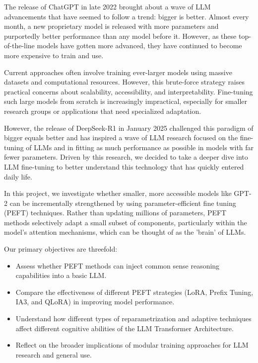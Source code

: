 \documentclass[11pt,twocolumn]{article}
\begin{document}
\indent The release of ChatGPT in late 2022 brought about a wave of LLM advancements that have seemed to follow a trend: bigger is better. Almost every month, a new proprietary model is released with more parameters and purportedly better performance than any model before it. However, as these top-of-the-line models have gotten more advanced, they have continued to become more expensive to train and use. 

Current approaches often involve training ever-larger models using massive datasets and computational resources. However, this brute-force strategy raises practical concerns about scalability, accessibility, and interpretability. Fine-tuning such large models from scratch is increasingly impractical, especially for smaller research groups or applications that need specialized adaptation.

However, the release of DeepSeek-R1 in January 2025 challenged this paradigm of bigger equals better and has inspired a wave of LLM research focused on the fine-tuning of LLMs and in fitting as much performance as possible in models with far fewer parameters. Driven by this research, we decided to take a deeper dive into LLM fine-tuning to better understand this technology that has quickly entered daily life.

In this project, we investigate whether smaller, more accessible models like GPT-2 can be incrementally strengthened by using parameter-efficient fine tuning (PEFT) techniques. Rather than updating millions of parameters, PEFT methods selectively adapt a small subset of components, particularly within the model's attention mechanisms, which can be thought of as the 'brain' of LLMs.

Our primary objectives are threefold:
\begin{itemize}
    \item Assess whether PEFT methods can inject common sense reasoning capabilities into a basic LLM.
    \item Compare the effectiveness of different PEFT strategies (LoRA, Prefix Tuning, IA3, and QLoRA) in improving model performance.
    \item Understand how different types of reparametrization and adaptive techniques affect different cognitive abilities of the LLM Transformer Architecture.
    \item Reflect on the broader implications of modular training approaches for LLM research and general use.
\end{itemize}
\end{document}
